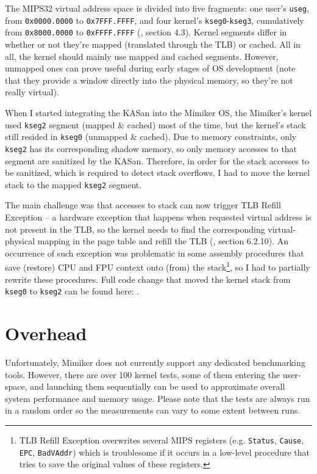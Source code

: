 \documentclass[shortabstract, manyadvisors, english, mgr]{iithesis}
\theoremstyle{definition} \newtheorem*{definition}{Definicja}
\theoremstyle{definition} \newtheorem*{example}{Przykład}
\theoremstyle{definition} \newtheorem*{remark}{Uwaga}
\begin{document}
The MIPS32 virtual address space is divided into five fragments: one user's \texttt{useg}, from \texttt{0x0000.0000} to \texttt{0x7FFF.FFFF}, and four kernel's \texttt{kseg0}-\texttt{kseg3}, cumulatively from \texttt{0x8000.0000} to \texttt{0xFFFF.FFFF} (\cite{bib:mips-architecture}, section 4.3). Kernel segments differ in whether or not they're mapped (translated through the TLB) or cached. All in all, the kernel should mainly use mapped and cached segments. However, unmapped ones can prove useful during early stages of OS development (note that they provide a window directly into the physical memory, so they're not really virtual).

When I started integrating the KASan into the Mimiker OS, the Mimiker's kernel used \texttt{kseg2} segment (mapped \& cached) most of the time, but the kernel's stack still resided in \texttt{kseg0} (unmapped \& cached). Due to memory constraints, only \texttt{kseg2} has its corresponding shadow memory, so only memory accesses to that segment are sanitized by the KASan. Therefore, in order for the stack accesses to be sanitized, which is required to detect stack overflows, I had to move the kernel stack to the mapped \texttt{kseg2} segment.

The main challenge was that accesses to stack can now trigger TLB Refill Exception -- a hardware exception that happens when requested virtual address is not present in the TLB, so the kernel needs to find the corresponding virtual-physical mapping in the page table and refill the TLB (\cite{bib:mips-architecture}, section 6.2.10). An occurrence of such exception was problematic in some assembly procedures that save (restore) CPU and FPU context onto (from) the stack\footnote{TLB Refill Exception overwrites several MIPS registers (e.g. \texttt{Status}, \texttt{Cause}, \texttt{EPC}, \texttt{BadVAddr}) which is troublesome if it occurs in a low-level procedure that tries to save the original values of these registers.}, so I had to partially rewrite these procedures. Full code change that moved the kernel stack from \texttt{kseg0} to \texttt{kseg2} can be found here: \cite{bib:github636}.


\section{Overhead}
Unfortunately, Mimiker does not currently support any dedicated benchmarking tools. However, there are over 100 kernel tests, some of them entering the user-space, and launching them sequentially can be used to approximate overall system performance and memory usage. Please note that the tests are always run in a random order so the measurements can vary to some extent between runs.
\end{document}
